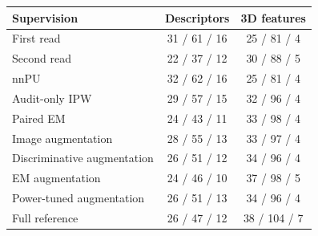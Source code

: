 \begin{tabular}{lcc}
\toprule
Supervision & Descriptors & 3D features \\
\midrule
First read & 31 / 61 / 16 & 25 / 81 / 4 \\
Second read & 22 / 37 / 12 & 30 / 88 / 5 \\
nnPU & 32 / 62 / 16 & 25 / 81 / 4 \\
Audit-only IPW & 29 / 57 / 15 & 32 / 96 / 4 \\
Paired EM & 24 / 43 / 11 & 33 / 98 / 4 \\
Image augmentation & 28 / 55 / 13 & 33 / 97 / 4 \\
Discriminative augmentation & 26 / 51 / 12 & 34 / 96 / 4 \\
EM augmentation & 24 / 46 / 10 & 37 / 98 / 5 \\
Power-tuned augmentation & 26 / 51 / 13 & 34 / 96 / 4 \\
Full reference & 26 / 47 / 12 & 38 / 104 / 7 \\
\bottomrule
\end{tabular}
